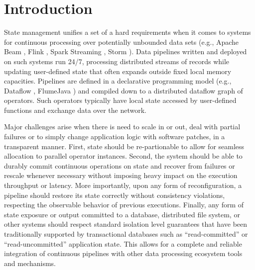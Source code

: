 
\section{Introduction}
\label{sec:intro}

State management unifies a set of a hard requirements when it comes to systems for continuous processing over potentially unbounded data sets (e.g., Apache Beam \cite{CUSTOM:web/beam}, Flink \cite{carbone2015flink}, Spark Streaming \cite{CUSTOM:web/SparkStructuredStreaming}, Storm \cite{CUSTOM:web/Storm}). Data pipelines written and deployed on such systems run 24/7, processing distributed streams of records while updating user-defined state that often expands outside fixed local memory capacities. Pipelines are defined in a declarative programming model (e.g., Dataflow \cite{akidau2015dataflow}, FlumeJava \cite{chambers2010flumejava}) and compiled down to a distributed dataflow graph of operators. Such operators typically have local state accessed by user-defined functions and exchange data over the network. 

Major challenges arise when there is need to scale in or out, deal with partial failures or to simply change application logic with software patches, in a transparent manner. First, state should be  re-partionable to allow for seamless allocation to parallel operator instances. Second, the system should be able to durably commit continuous operations on state and recover from failures or rescale whenever necessary without imposing heavy impact on the execution throughput or latency. More importantly, upon any form of reconfiguration, a pipeline should restore its state correctly without consistency violations, respecting the observable behavior of previous executions. Finally, any form of state exposure or output committed to a database, distributed file system, or other systems should respect standard isolation level guarantees that have been traditionally supported by transactional databases such as ``read-committed'' or ``read-uncommitted'' application state. This allows for a complete and reliable integration of continuous pipelines with other data processing ecosystem tools and mechanisms.



